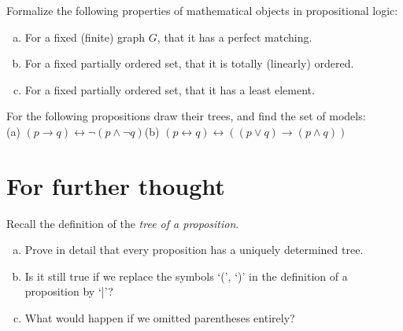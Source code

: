 \begin{problem}

    Formalize the following properties of mathematical objects in propositional logic:
    \begin{enumerate}[(a)]
        \item For a fixed (finite) graph $G$, that it has a perfect matching.
        \item For a fixed partially ordered set, that it is totally (linearly) ordered.
        \item For a fixed partially ordered set, that it has a least element.
    \end{enumerate}

\end{problem}


\begin{problem} 
    
    For the following propositions draw their trees, and find the set of models: \\(a) $(p \to q) \leftrightarrow \neg (p \wedge \neg q)$\qquad (b) $(p \leftrightarrow q) \leftrightarrow ((p \vee q) \to (p \wedge q))$

\end{problem}



\section*{For further thought}


\begin{problem}

    Recall the definition of the \emph{tree of a proposition}.
    \begin{enumerate}[(a)]
        \item Prove in detail that every proposition has a uniquely determined tree.
        \item Is it still true if we replace the symbols `(', `)' in the definition of a proposition by `|'?
        \item What would happen if we omitted parentheses entirely?
    \end{enumerate}

\end{problem}

